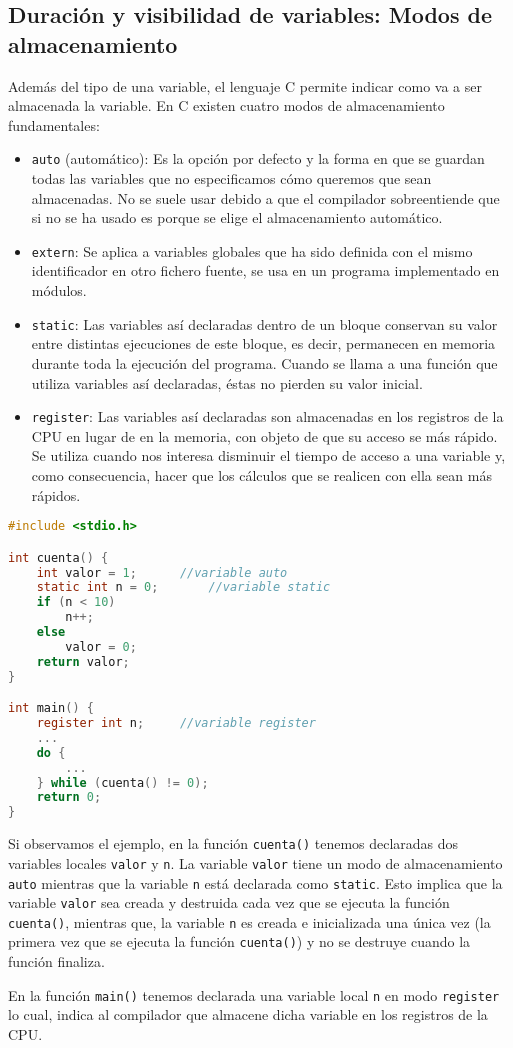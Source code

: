 \subsection{Duración y visibilidad de variables: Modos de almacenamiento}{
Además del tipo de una variable, el lenguaje C permite indicar como va a ser almacenada la variable. En C existen cuatro modos de almacenamiento fundamentales:
\begin{itemize}
	\item \texttt{auto} (automático): Es la opción por defecto y la forma en que se guardan todas las variables que no especificamos cómo queremos que sean almacenadas. No se suele usar debido a que el compilador sobreentiende que si no se ha usado es porque se elige el almacenamiento automático.
	\item \texttt{extern}: Se aplica a variables globales que ha sido definida con el mismo identificador en otro fichero fuente, se usa en un programa implementado en módulos.
	\item \texttt{static}: Las variables así declaradas dentro de un bloque conservan su valor entre distintas ejecuciones de este bloque, es decir, permanecen en memoria durante toda la ejecución del programa. Cuando se llama a una función que utiliza variables así declaradas, éstas no pierden su valor inicial.
	\item \texttt{register}: Las variables así declaradas son almacenadas en los registros de la CPU en lugar de en la memoria, con objeto de que su acceso se más rápido. Se utiliza cuando nos interesa disminuir el tiempo de acceso a una variable y, como consecuencia, hacer que los cálculos que se realicen con ella sean más rápidos.
\end{itemize}
\begin{Ejemplo}
\begin{lstlisting}[language=C]
#include <stdio.h>

int cuenta() {
    int valor = 1;		//variable auto
    static int n = 0;		//variable static
    if (n < 10)
        n++;
    else
        valor = 0;
    return valor;
}

int main() {
    register int n;		//variable register
    ...
    do {
        ...
    } while (cuenta() != 0);
    return 0;
}
\end{lstlisting}
\Explicacion
Si observamos el ejemplo, en la función \texttt{cuenta()} tenemos declaradas dos variables locales \texttt{valor} y \texttt{n}. La variable \texttt{valor} tiene un modo de almacenamiento \texttt{auto} mientras que la variable \texttt{n} está declarada como \texttt{static}. Esto implica que la variable \texttt{valor} sea creada y destruida cada vez que se ejecuta la función \texttt{cuenta()}, mientras que, la variable \texttt{n} es creada e inicializada una única vez (la primera vez que se ejecuta la función \texttt{cuenta()}) y no se destruye cuando la función finaliza.

En la función \texttt{main()} tenemos declarada una variable local \texttt{n} en modo \texttt{register} lo cual, indica al compilador que almacene dicha variable en los registros de la CPU.
\end{Ejemplo}
}
